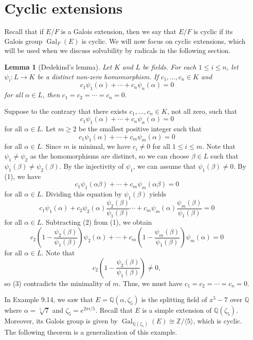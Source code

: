\documentclass[10pt]{article}
\makeatletter
\newcommand{\Z}{\mathbb{Z}}
\newcommand{\Q}{\mathbb{Q}}
\DeclareMathOperator{\Gal}{Gal}
\theoremstyle{newstyle}
\newtheorem{lemma}[thm]{Lemma}
\newenvironment{pf}[1][\proofname]{\par
  \pushQED{\qed}%
  \normalfont \topsep0\p@\relax
  \trivlist
  \item[\hskip\labelsep\scshape
  #1\@addpunct{.}]\ignorespaces
}{%
  \popQED\endtrivlist\@endpefalse
}
\makeatother
\begin{document}
\newpage 
\section{Cyclic extensions}

Recall that if $E/F$ is a Galois extension, then we say that $E/F$ is cyclic if its Galois 
group $\Gal_F(E)$ is cyclic. 
We will now focus on cyclic extensions,
which will be used when we discuss solvability by radicals in the 
following section. 

\begin{lemma}[Dedekind's lemma]
Let $K$ and $L$ be fields. For each $1 \leq i \leq n$, let 
$\psi_i : L \to K$ be a distinct non-zero homomorphism. If $c_1, \dots, c_n \in K$ and 
\[ c_1\psi_1(\alpha) + \cdots + c_n\psi_n(\alpha) = 0 \]
for all $\alpha \in L$, then $c_1 = c_2 = \cdots = c_n = 0$. 
\end{lemma}
\begin{pf}
Suppose to the contrary that there exists $c_1, \dots, c_n \in K$, not all zero, such that 
\[ c_1\psi_1(\alpha) + \cdots + c_n\psi_n(\alpha) = 0 \]
for all $\alpha \in L$. Let $m \geq 2$ be the smallest positive integer such that 
\[ c_1\psi_1(\alpha) + \cdots + c_m\psi_m(\alpha) = 0 \tag{1} \]
for all $\alpha \in L$. Since $m$ is minimal, we have $c_i \neq 0$ for all $1 \leq i \leq m$. 
Note that $\psi_1 \neq \psi_2$ as the homomorphisms are distinct, so we can choose $\beta \in L$ 
such that $\psi_1(\beta) \neq \psi_2(\beta)$. By the injectivity of $\psi_1$, we can 
assume that $\psi_1(\beta) \neq 0$. By (1), we have 
\[ c_1\psi_1(\alpha\beta) + \cdots + c_m\psi_m(\alpha\beta) = 0 \]
for all $\alpha \in L$. Dividing this equation by $\psi_1(\beta)$ yields 
\[ c_1\psi_1(\alpha) + c_2 \psi_2(\alpha) \frac{\psi_2(\beta)}{\psi_1(\beta)} 
\cdots + c_m\psi_m(\alpha) \frac{\psi_m(\beta)}{\psi_1(\beta)} = 0 \tag{2} \]
for all $\alpha \in L$. Subtracting (2) from (1), we obtain 
\[ c_2 \left(1 - \frac{\psi_2(\beta)}{\psi_1(\beta)} \right) \psi_2(\alpha) 
+ \cdots + c_m \left( 1 - \frac{\psi_m(\beta)}{\psi_1(\beta)} \right) \psi_m(\alpha) = 0 \tag{3} \]
for all $\alpha \in L$. Note that 
\[ c_2 \left(1 - \frac{\psi_2(\beta)}{\psi_1(\beta)} \right) \neq 0, \]
so (3) contradicts the minimality of $m$. Thus, we must have $c_1 = c_2 = \cdots = c_n = 0$. 
\end{pf}

In Example 9.14, we saw that $E = \Q(\alpha, \zeta_5)$ is the splitting field of $x^5 - 7$ 
over $\Q$ where $\alpha = \sqrt[5]{7}$ and $\zeta_5 = e^{2\pi i/5}$. 
Recall that $E$ is a simple extension of $\Q(\zeta_5)$. Moreover, its Galois group is 
given by $\Gal_{\Q(\zeta_5)}(E) \cong \Z/\langle 5 \rangle$, which is cyclic. 
The following theorem is a generalization of this example. 
\end{document}
